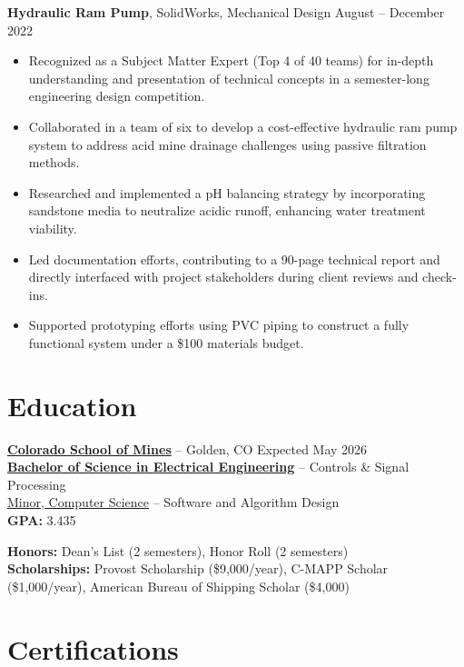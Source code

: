 \documentclass[11pt]{article}       %
\begin{document}
\textbf{Hydraulic Ram Pump}, SolidWorks, Mechanical Design \hfill August -- December 2022
\vspace{-5pt}
\begin{itemize}
  \item Recognized as a Subject Matter Expert (Top 4 of 40 teams) for in-depth understanding and presentation of technical concepts in a semester-long engineering design competition.
  \item Collaborated in a team of six to develop a cost-effective hydraulic ram pump system to address acid mine drainage challenges using passive filtration methods.
  \item Researched and implemented a pH balancing strategy by incorporating sandstone media to neutralize acidic runoff, enhancing water treatment viability.
  \item Led documentation efforts, contributing to a 90-page technical report and directly interfaced with project stakeholders during client reviews and check-ins.
  \item Supported prototyping efforts using PVC piping to construct a fully functional system under a \$100 materials budget.
\end{itemize}


\vspace{-12pt}
\section*{Education}
\vspace{3pt}

\textbf{\href{https://www.mines.edu/}{Colorado School of Mines}} -- Golden, CO \hfill Expected May 2026 \\
\textbf{\href{https://electrical.mines.edu/undergraduate-program/}{Bachelor of Science in Electrical Engineering}} -- Controls \& Signal Processing \\
\href{https://cs.mines.edu/csmines-minors-and-areas-of-special-interest/}{Minor, Computer Science} -- Software and Algorithm Design \\
\textbf{GPA:} 3.435

\textbf{Honors:} Dean's List (2 semesters), Honor Roll (2 semesters) \\
\textbf{Scholarships:} Provost Scholarship (\$9,000/year), C-MAPP Scholar (\$1,000/year), American Bureau of Shipping Scholar (\$4,000)

\vspace{-8pt}
\section*{Certifications}
\vspace{3pt}
\end{document}

